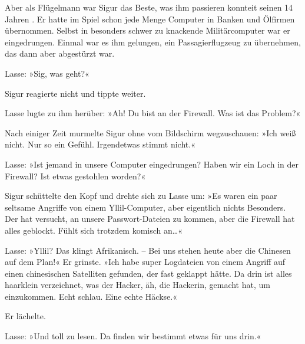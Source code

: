 Aber als Flügelmann war Sigur das Beste, was ihm passieren konnteit seinen 14 Jahren .
Er hatte im Spiel schon jede Menge Computer in Banken und Ölfirmen übernommen. Selbst in besonders schwer zu knackende Militärcomputer war er  eingedrungen.
Einmal war es ihm gelungen, ein Passagierflugzeug zu übernehmen, das dann aber abgestürzt war.

Lasse: »Sig, was geht?«

Sigur reagierte nicht und tippte weiter.

Lasse lugte zu ihm herüber: »Ah! Du bist an der Firewall.
Was ist das Problem?«

Nach einiger Zeit murmelte Sigur ohne vom Bildschirm wegzuschauen: »Ich weiß nicht.
Nur so ein Gefühl.
Irgendetwas stimmt nicht.«

Lasse: »Ist jemand in unsere Computer eingedrungen?
Haben wir ein Loch in der Firewall?
Ist etwas gestohlen worden?«

Sigur schüttelte den Kopf und drehte sich zu Lasse um: »Es waren ein paar seltsame Angriffe von einem Yllil-Computer, aber eigentlich nichts Besonders.
Der hat versucht, an unsere Passwort-Dateien zu kommen, aber die Firewall hat alles geblockt.
Fühlt sich trotzdem komisch an\dots«

Lasse: »Yllil? Das klingt Afrikanisch.
-- Bei uns stehen heute aber die Chinesen auf dem Plan!« Er grinste.
»Ich habe super Logdateien von einem Angriff auf einen chinesischen Satelliten gefunden, der fast geklappt hätte.
Da drin ist alles haarklein verzeichnet, was der Hacker, äh, die Hackerin, gemacht hat, um einzukommen.
Echt schlau.
Eine echte Häckse.« 

Er lächelte.

Lasse: »Und toll zu lesen.
Da finden wir bestimmt etwas für uns drin.«


